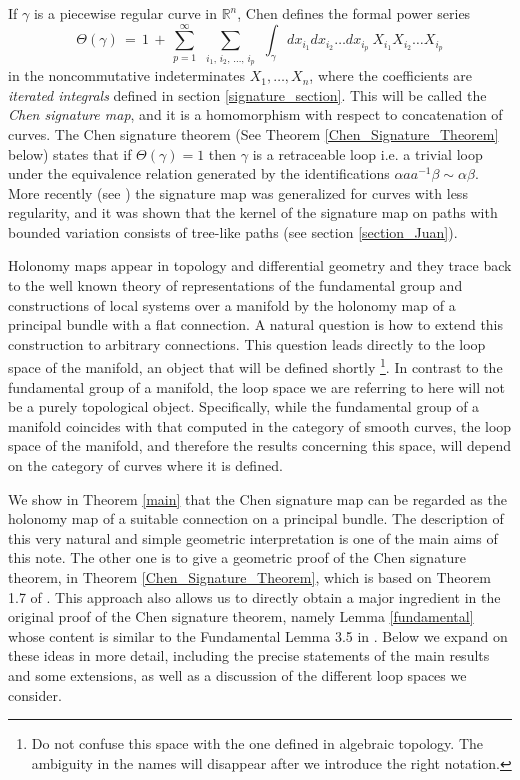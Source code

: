 \documentclass{amsart}
\newcommand{\R}{{\mathbb R}}
\begin{document}
If  $\gamma$ is a piecewise regular curve in $\R^n$, Chen  defines the formal power series
\[
\Theta(\gamma)\, =\,1\,+\, \sum^{\infty}_{p=1}\,\  \sum_{i_1,\,i_2,\, \ldots,\,i_p}\  \,\int_{\gamma} dx_{i_1}dx_{i_2} \ldots dx_{i_p}\        X_{i_1}X_{i_2} \ldots X_{i_p}
\]
in the noncommutative indeterminates $X_1, \ldots, X_n$, where the coefficients are {\em iterated integrals} defined in section \ref{signature_section}. This will be called the \textit{Chen signature map}, and it is a homomorphism with respect to concatenation of curves. The Chen signature theorem (See Theorem \ref{Chen_Signature_Theorem} below) states that if 
$\Theta(\gamma)=1$ then $\gamma$   is a retraceable loop i.e.  a trivial loop under the equivalence relation generated by the identifications   $\alpha aa^{-1}\beta\sim \alpha\beta$.   
More recently (see  \cite{Lyons1, Lyons2, Lyons2prima, Lyons3}) the signature map was generalized for curves with less regularity, and it was shown that the kernel of the signature map  on paths with bounded variation consists of tree-like paths (see section  \ref{section_Juan}).  





Holonomy maps appear in  topology and differential geometry and  they trace back to the well known theory of representations of the fundamental group and constructions of local systems over a manifold by the holonomy map of a principal bundle with a flat connection. A natural question is how to extend this construction to arbitrary connections. This question leads directly to the loop space of the manifold, an object that will be defined shortly \footnote{Do not confuse this space with the one defined in algebraic topology. The ambiguity in the names will disappear after we introduce the right notation.}. In contrast to the fundamental group of a manifold, the loop space we are referring to here will not be a purely topological object.
Specifically, while the fundamental group of a manifold coincides with that computed in the category of smooth curves, the loop space of the manifold, and therefore the results concerning this space, will depend on the category of curves where it is defined.

We show in Theorem \ref{main} that the Chen signature map can be regarded as the holonomy map of a suitable connection on a principal bundle. The description of this very natural and simple  geometric interpretation is one of the main aims of this note. The other one is to give a geometric proof  of the Chen signature theorem, in Theorem \ref{Chen_Signature_Theorem}, which is based on Theorem 1.7 of 
\cite{Holonomy}. This approach also allows us to directly  obtain a  major ingredient in the original proof of the Chen signature theorem, namely Lemma \ref{fundamental} whose content is  similar to the  Fundamental Lemma 3.5 in  \cite{Chen2}.  
Below we expand on these ideas in more detail, including the precise statements of the main results and some extensions, as well as a discussion of the different loop spaces we consider.  %
\end{document}
